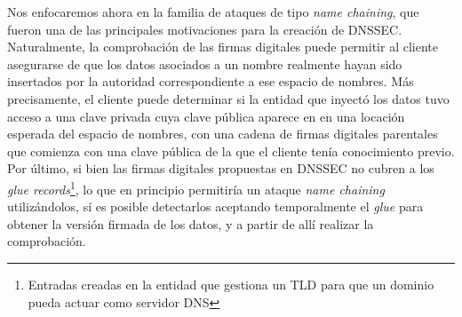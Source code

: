 Nos enfocaremos ahora en la familia de ataques de tipo \textit{name chaining}, que fueron una de las principales motivaciones para la creaci\'on de DNSSEC. Naturalmente, la comprobaci\'on de las firmas digitales puede permitir al cliente asegurarse de que los datos asociados a un nombre realmente hayan sido insertados por la autoridad correspondiente a ese espacio de nombres. M\'as precisamente, el cliente puede determinar si la entidad que inyect\'o los datos tuvo acceso a una clave privada cuya clave p\'ublica aparece en en una locaci\'on esperada del espacio de nombres, con una cadena de firmas digitales parentales que comienza con una clave p\'ublica de la que el cliente ten\'ia conocimiento previo.\\
Por \'ultimo, si bien las firmas digitales propuestas en DNSSEC no cubren a los \textit{glue records}\footnote{Entradas creadas en la entidad que gestiona un TLD para que un dominio pueda actuar como servidor DNS}, lo que en principio permitir\'ia un ataque \textit{name chaining} utiliz\'andolos, s\'i es posible detectarlos aceptando temporalmente el \textit{glue} para obtener la versi\'on firmada de los datos, y a partir de all\'i realizar la comprobaci\'on.